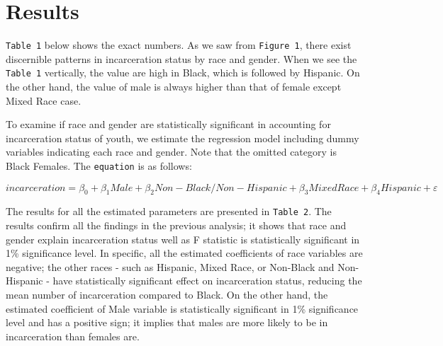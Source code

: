 \documentclass{article}
\begin{document}
\section{Results}

\texttt{Table 1} below shows the exact numbers. As we saw from \texttt{Figure 1}, there exist discernible patterns in incarceration status by race and gender. When we see the \texttt{Table 1} vertically, the value are high in Black, which is followed by Hispanic. On the other hand, the value of male is always higher than that of female except Mixed Race case.



\vspace{1cm}
To examine if race and gender are statistically significant in accounting for incarceration status of youth, we estimate the regression model including dummy variables indicating each race and gender. Note that the omitted category is Black Females. The \texttt{equation} is as follows:

\vspace{0.5cm}
\begin{equation*}
    incarceration = \beta_0 + \beta_1Male + \beta_2Non-Black/Non-Hispanic + \beta_3Mixed Race + \beta_4Hispanic + \varepsilon
\end{equation*}
\vspace{0.5cm}

The results for all the estimated parameters are presented in \texttt{Table 2}. The results confirm all the findings in the previous analysis; it shows that race and gender explain incarceration status well as F statistic is statistically significant in 1\% significance level. In specific, all the estimated coefficients of race variables are negative; the other races - such as Hispanic, Mixed Race, or Non-Black and Non-Hispanic - have statistically significant effect on incarceration status, reducing the mean number of incarceration compared to Black. On the other hand, the estimated coefficient of Male variable is statistically significant in 1\% significance level and has a positive sign; it implies that males are more likely to be in incarceration than females are.


\end{document}
